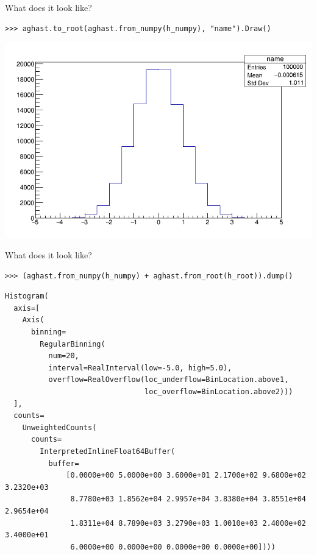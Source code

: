 \documentclass[aspectratio=169]{beamer}
\begin{document}
\begin{frame}[fragile]{What does it look like?}
\vspace{0.5 cm}
\small
\begin{verbatim}
>>> aghast.to_root(aghast.from_numpy(h_numpy), "name").Draw()
\end{verbatim}

\begin{center}
\includegraphics[width=0.65\linewidth]{c1.png}
\end{center}
\end{frame}

\begin{frame}[fragile]{What does it look like?}
\vspace{0.5 cm}
\small
\begin{verbatim}
>>> (aghast.from_numpy(h_numpy) + aghast.from_root(h_root)).dump()
\end{verbatim}

\scriptsize
\begin{verbatim}
Histogram(
  axis=[
    Axis(
      binning=
        RegularBinning(
          num=20,
          interval=RealInterval(low=-5.0, high=5.0),
          overflow=RealOverflow(loc_underflow=BinLocation.above1,
                                loc_overflow=BinLocation.above2)))
  ],
  counts=
    UnweightedCounts(
      counts=
        InterpretedInlineFloat64Buffer(
          buffer=
              [0.0000e+00 5.0000e+00 3.6000e+01 2.1700e+02 9.6800e+02 3.2320e+03
               8.7780e+03 1.8562e+04 2.9957e+04 3.8380e+04 3.8551e+04 2.9654e+04
               1.8311e+04 8.7890e+03 3.2790e+03 1.0010e+03 2.4000e+02 3.4000e+01
               6.0000e+00 0.0000e+00 0.0000e+00 0.0000e+00])))
\end{verbatim}
\end{frame}
\end{document}
